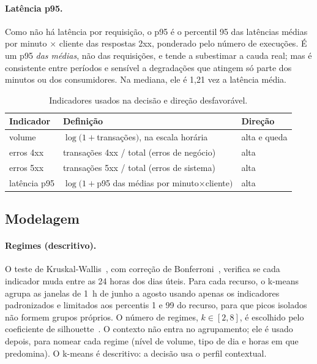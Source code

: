 \documentclass[sigconf,nonacm]{acmart}
\begin{document}
\paragraph{Latência p95.} Como não há latência por requisição, o p95 é o percentil 95 das latências médias por minuto $\times$ cliente das respostas 2xx, ponderado pelo número de execuções. É um p95 \emph{das médias}, não das requisições, e tende a subestimar a cauda real; mas é consistente entre períodos e sensível a degradações que atingem só parte dos minutos ou dos consumidores. Na mediana, ele é 1,21 vez a latência média.

\begin{table}[t]
  \caption{Indicadores usados na decisão e direção desfavorável.}
  \label{tab:atributos}
  \small
  \begin{tabular}{p{}p{}p{}}
    \toprule
    Indicador & Definição & Direção \\
    \midrule
    volume & $\log(1+$transações$)$, na escala horária & alta e queda \\
    erros 4xx & transações 4xx / total (erros de negócio) & alta \\
    erros 5xx & transações 5xx / total (erros de sistema) & alta \\
    latência p95 & $\log(1+$p95 das médias por minuto$\times$cliente$)$ & alta \\
    \bottomrule
  \end{tabular}
\end{table}

\subsection{Modelagem}

\paragraph{Regimes (descritivo).} O teste de Kruskal-Wallis~\citep{kruskal1952ranks}, com correção de Bonferroni~\citep{dunn1961multiple}, verifica se cada indicador muda entre as 24 horas dos dias úteis. Para cada recurso, o k-means~\citep{lloyd1982kmeans} agrupa as janelas de 1~h de junho a agosto usando apenas os indicadores padronizados e limitados aos percentis 1 e 99 do recurso, para que picos isolados não formem grupos próprios. O número de regimes, $k\in[2,8]$, é escolhido pelo coeficiente de silhouette~\citep{rousseeuw1987silhouette}. O contexto não entra no agrupamento; ele é usado depois, para nomear cada regime (nível de volume, tipo de dia e horas em que predomina). O k-means é descritivo: a decisão usa o perfil contextual.
\end{document}
